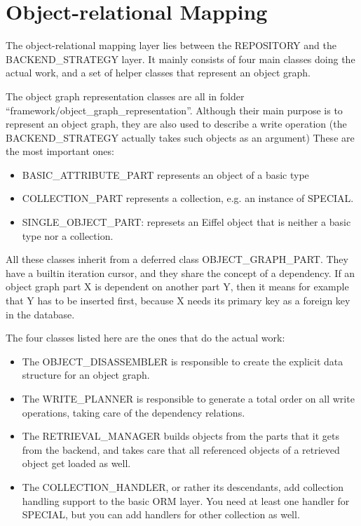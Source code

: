 \section{Object-relational Mapping}
\label{section:ORM}

The object-relational mapping layer lies between the REPOSITORY and the BACKEND\_STRATEGY layer.
It mainly consists of four main classes doing the actual work, and a set of helper classes that represent an object graph.

The object graph representation classes are all in folder ``framework/object\_graph\_representation''. 
Although their main purpose is to represent an object graph, they are also used to describe a write operation (the BACKEND\_STRATEGY actually takes such objects as an argument)
These are the most important ones:

\begin{itemize}
 \item BASIC\_ATTRIBUTE\_PART represents an object of a basic type
 \item COLLECTION\_PART represents a collection, e.g. an instance of SPECIAL.
 \item SINGLE\_OBJECT\_PART: represets an Eiffel object that is neither a basic type nor a collection.
\end{itemize}

All these classes inherit from a deferred class OBJECT\_GRAPH\_PART. 
They have a builtin iteration cursor, and they share the concept of a dependency.
If an object graph part X is dependent on another part Y, then it means for example that Y has to be inserted first, because X needs its primary key as a foreign key in the database.

The four classes listed here are the ones that do the actual work:

\begin{itemize}
 \item The OBJECT\_DISASSEMBLER is responsible to create the explicit data structure for an object graph.
 \item The WRITE\_PLANNER is responsible to generate a total order on all write operations, taking care of the dependency relations.
 \item The RETRIEVAL\_MANAGER builds objects from the parts that it gets from the backend, and takes care that all referenced objects of a retrieved object get loaded as well.
 \item The COLLECTION\_HANDLER, or rather its descendants, add collection handling support to the basic ORM layer. 
 You need at least one handler for SPECIAL, but you can add handlers for other collection as well.
\end{itemize}

